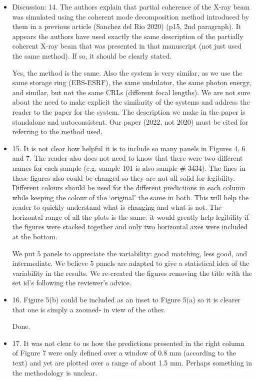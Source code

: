 \documentclass[11pt]{letter} %
\newcommand{\inred}[1]{{\color{red}#1}}
\begin{document}
\begin{letter}{}
\begin{itemize}
    \item Discussion: 14. The authors explain that partial coherence of the X-ray beam was simulated using the coherent mode decomposition method introduced by them in a previous article (Sanchez del Rio 2020) (p15, 2nd paragraph). It appears the authors have used exactly the same description of the partially coherent X-ray beam that was presented in that manuscript (not just used the same method). If so, it should be clearly stated.
    
    \inred{Yes, the method is the same. Also the system is very similar, as we use the same storage ring (EBS-ESRF), the same undulator, the same photon energy, and similar, but not the same CRLs (different focal lengths). We are not sure about the need to make explicit the similarity of the systems and address the reader to the paper for the system. The description we make in the paper is standalone and autoconsistent. Our paper (2022, not 2020) must be cited for referring to the method used.}
    
    \item 15. It is not clear how helpful it is to include so many panels in Figures 4, 6 and 7. The reader also does not need to know that there were two different names for each sample (e.g. sample 101 is also sample \# 3434). The lines in these figures also could be changed so they are not all solid for legibility. Different colours should be used for the different predictions in each column while keeping the colour of the ‘original’ the same in both. This will help the reader to quickly understand what is changing and what is not. The horizontal range of all the plots is the same: it would greatly help legibility if the figures were stacked together and only two horizontal axes were included at the bottom.
    
    \inred{We put 5 panels to appreciate the variability: good matching, less good, and intermediate. We believe 5 panels are adapted to give a statistical idea of the variability in the results. We re-created the figures removing the title with the set id's following  the reviewer's advice.}
    
    \item 16. Figure 5(b) could be included as an inset to Figure 5(a) so it is clearer that one is simply a zoomed- in view of the other.
    
    \inred{Done.}
    
    \item 17. It was not clear to us how the predictions presented in the right column of Figure 7 were only defined over a window of 0.8 mm (according to the text) and yet are plotted over a range of about 1.5 mm. Perhaps something in the methodology is unclear.
    

\end{itemize}
\end{letter}
\end{document}
